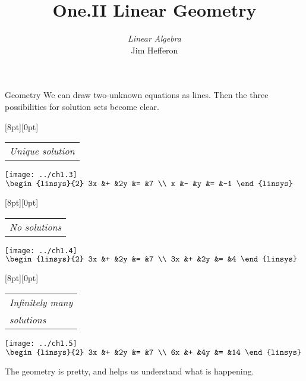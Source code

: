 \documentclass[10pt,t,serif,professionalfont]{beamer}
\title[Linear Geometry] %
{One.II Linear Geometry}
\author{\textit{Linear Algebra} \\ {\small Jim Hef{}feron}}
\institute{
  \texttt{http://joshua.smcvt.edu/linearalgebra}
}
\date{}
\begin{document}
\begin{frame}
  \titlepage
\end{frame}

\begin{frame}{Geometry} 
We can draw two-unknown equations as lines.
Then the three possibilities for solution sets become clear.
\pause
\begin{center} %
  \begin{minipage}[b]{1.35in}
    \raisebox{-2pt}[8pt][0pt]{\small \begin{tabular}{@{}l}
      \small \textit{Unique solution}
    \end{tabular}}
    \begin{center}
      \texttt{[image: ../ch1.3]} \\[.75ex]
      \small $\begin{linsys}{2}
                         3x  &+  &2y  &=  &7   \\
                         x   &-  &y   &=  &-1
                       \end{linsys}$
    \end{center}
  \end{minipage}
  \hspace*{0em}
  \begin{minipage}[b]{1.35in}
    \raisebox{-2pt}[8pt][0pt]{\small \begin{tabular}{@{}l}
      \small \textit{No solutions}
    \end{tabular}}
    \begin{center}
      \texttt{[image: ../ch1.4]} \\[.75ex]
      \small $\begin{linsys}{2}
                         3x  &+  &2y  &=  &7   \\
                         3x  &+  &2y  &=  &4
                       \end{linsys}$
    \end{center}
  \end{minipage}
  \hspace*{0em}
  \begin{minipage}[b]{1.35in}
    \raisebox{-2pt}[8pt][0pt]{\small \begin{tabular}[t]{@{}l}
      \textit{Infinitely many} \\
      \textit{solutions}
    \end{tabular}}
    \begin{center}
      \texttt{[image: ../ch1.5]}         \\[.75ex]
      \small $ \begin{linsys}{2}
                         3x  &+  &2y  &=  &7   \\
                         6x  &+  &4y  &=  &14
                       \end{linsys}$
    \end{center}
  \end{minipage}
\end{center}
The geometry is pretty, and helps us understand what is happening.
\end{frame}
\end{document}
